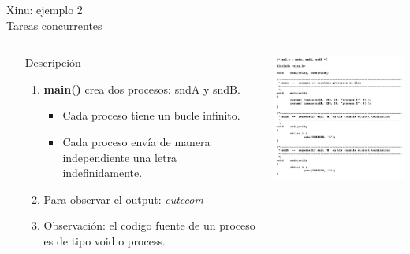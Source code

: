 \documentclass[8pt,aspectratio=169,compress]{beamer}
\begin{document}
\begin{frame}[fragile]{Xinu: ejemplo 2 \\ Tareas concurrentes}

    \begin{columns}[onlytextwidth,T]
      \column{\dimexpr\linewidth-70mm-5mm}

\begin{small}
	\begin{itemize}
\bigskip
  \item[Descripción]
\begin{enumerate}
\item \textbf{main()} crea dos procesos: sndA y sndB.
	\begin{itemize}
\item Cada proceso tiene un bucle infinito.
\item Cada proceso envía de manera independiente una letra indefinidamente.
	\end{itemize}

\bigskip
\item Para observar el output: \textit{cutecom}
\bigskip
\item Observación: el codigo fuente de un proceso es de tipo void o process.
\end{enumerate}
	\end{itemize}

\end{small}

      \column{70mm}
     \includegraphics[width=70mm]{images/ejemplo2.jpg}

    \end{columns}
\end{frame}
\end{document}
